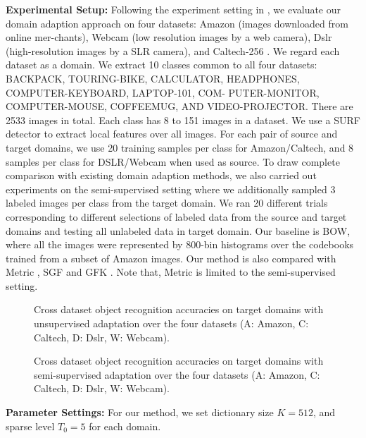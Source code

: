 \documentclass{article}
\begin{document}
\textbf{Experimental Setup:} Following the experiment setting in \cite{gong2012geodesic}, we evaluate our domain adaption approach on four datasets: Amazon (images downloaded from online mer-chants), Webcam (low resolution images by a web camera), Dslr (high-resolution images by a SLR camera), and Caltech-256 \cite{griffin2007caltech}. We regard each dataset as a domain. %
 We extract 10 classes common to all four datasets: BACKPACK, TOURING-BIKE, CALCULATOR, HEADPHONES, COMPUTER-KEYBOARD, LAPTOP-101, COM-  PUTER-MONITOR, COMPUTER-MOUSE, COFFEEMUG, AND VIDEO-PROJECTOR. There are 2533 images in total. Each class has 8 to 151 images in a dataset. We use a SURF detector \cite{bay2008speeded} to extract local features over all images. For each pair of source and target domains, we use 20 training samples per class for Amazon/Caltech, and 8 samples per class for DSLR/Webcam when used as source. To draw complete comparison with existing domain adaption methods, we also carried out experiments on the semi-supervised setting where we additionally sampled 3 labeled images per class from the target domain. We ran 20 different trials corresponding to different selections of labeled data from the source and target domains and testing all unlabeled data in target domain. Our baseline is BOW, where all the images were represented by 800-bin histograms over the codebooks trained from a subset of Amazon images. Our method is also compared with Metric \cite{saenko2010adapting}, SGF \cite{gopalan2011domain} and GFK \cite{gong2012geodesic}. Note that, Metric \cite{saenko2010adapting} is limited to the semi-supervised setting.

\begin{figure}[t]
\label{fig:fig3}
\centering {}
             \caption{Cross dataset object recognition accuracies on target domains with unsupervised adaptation over the four datasets (A: Amazon, C: Caltech, D: Dslr, W: Webcam).}
\end{figure}

\begin{figure}[t]
\label{fig:fig4}
\centering {}
             \caption{Cross dataset object recognition accuracies on target domains with semi-supervised adaptation over the four datasets (A: Amazon, C: Caltech, D: Dslr, W: Webcam).}
\end{figure}

\textbf{Parameter Settings:} For our method, we set dictionary size $K=512$, and sparse level $T_0=5$ for each domain.
\end{document}
